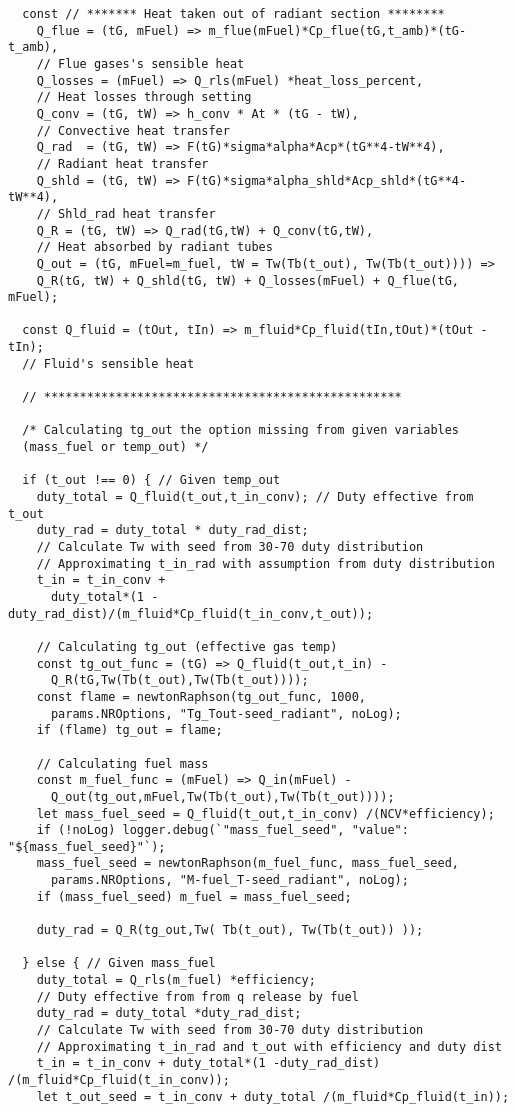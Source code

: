 \begin{verbatim}
  const // ******* Heat taken out of radiant section ********
    Q_flue = (tG, mFuel) => m_flue(mFuel)*Cp_flue(tG,t_amb)*(tG-t_amb), 
    // Flue gases's sensible heat 
    Q_losses = (mFuel) => Q_rls(mFuel) *heat_loss_percent,    
    // Heat losses through setting
    Q_conv = (tG, tW) => h_conv * At * (tG - tW),             
    // Convective heat transfer
    Q_rad  = (tG, tW) => F(tG)*sigma*alpha*Acp*(tG**4-tW**4), 
    // Radiant heat transfer
    Q_shld = (tG, tW) => F(tG)*sigma*alpha_shld*Acp_shld*(tG**4-tW**4), 
    // Shld_rad heat transfer
    Q_R = (tG, tW) => Q_rad(tG,tW) + Q_conv(tG,tW), 
    // Heat absorbed by radiant tubes
    Q_out = (tG, mFuel=m_fuel, tW = Tw(Tb(t_out), Tw(Tb(t_out)))) => 
    Q_R(tG, tW) + Q_shld(tG, tW) + Q_losses(mFuel) + Q_flue(tG, mFuel);

  const Q_fluid = (tOut, tIn) => m_fluid*Cp_fluid(tIn,tOut)*(tOut -tIn); 
  // Fluid's sensible heat

  // **************************************************

  /* Calculating tg_out the option missing from given variables 
  (mass_fuel or temp_out) */

  if (t_out !== 0) { // Given temp_out
    duty_total = Q_fluid(t_out,t_in_conv); // Duty effective from t_out
    duty_rad = duty_total * duty_rad_dist; 
    // Calculate Tw with seed from 30-70 duty distribution
    // Approximating t_in_rad with assumption from duty distribution
    t_in = t_in_conv + 
      duty_total*(1 -duty_rad_dist)/(m_fluid*Cp_fluid(t_in_conv,t_out));

    // Calculating tg_out (effective gas temp)
    const tg_out_func = (tG) => Q_fluid(t_out,t_in) -
      Q_R(tG,Tw(Tb(t_out),Tw(Tb(t_out))));
    const flame = newtonRaphson(tg_out_func, 1000, 
      params.NROptions, "Tg_Tout-seed_radiant", noLog);
    if (flame) tg_out = flame;

    // Calculating fuel mass
    const m_fuel_func = (mFuel) => Q_in(mFuel) -
      Q_out(tg_out,mFuel,Tw(Tb(t_out),Tw(Tb(t_out))));
    let mass_fuel_seed = Q_fluid(t_out,t_in_conv) /(NCV*efficiency);
    if (!noLog) logger.debug(`"mass_fuel_seed", "value": "${mass_fuel_seed}"`);
    mass_fuel_seed = newtonRaphson(m_fuel_func, mass_fuel_seed,
      params.NROptions, "M-fuel_T-seed_radiant", noLog);
    if (mass_fuel_seed) m_fuel = mass_fuel_seed;

    duty_rad = Q_R(tg_out,Tw( Tb(t_out), Tw(Tb(t_out)) ));

  } else { // Given mass_fuel
    duty_total = Q_rls(m_fuel) *efficiency; 
    // Duty effective from from q release by fuel
    duty_rad = duty_total *duty_rad_dist; 
    // Calculate Tw with seed from 30-70 duty distribution
    // Approximating t_in_rad and t_out with efficiency and duty dist
    t_in = t_in_conv + duty_total*(1 -duty_rad_dist) /(m_fluid*Cp_fluid(t_in_conv));
    let t_out_seed = t_in_conv + duty_total /(m_fluid*Cp_fluid(t_in));


\end{verbatim}
